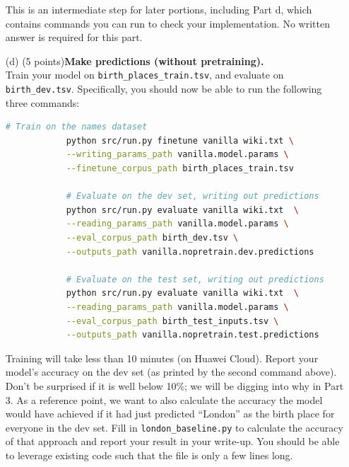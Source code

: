 \documentclass[letterpaper,12pt]{article}
\begin{document}
\begin{itemize}
		This is an intermediate step for later portions, including Part d, which contains commands you can run to check your implementation. No written answer is required for this part.
		
	\item[(d)]
		(5 points)\textbf{Make predictions (without pretraining).}\\ 
		Train your model on \texttt{birth\_places\_train.tsv}, and evaluate on \texttt{birth\_dev.tsv}. Specifically, you should now be able to run the following three commands:
		\begin{lstlisting}[language=bash, basicstyle=\small\ttfamily]
			# Train on the names dataset
			python src/run.py finetune vanilla wiki.txt \
			--writing_params_path vanilla.model.params \
			--finetune_corpus_path birth_places_train.tsv
			
			# Evaluate on the dev set, writing out predictions
			python src/run.py evaluate vanilla wiki.txt  \
			--reading_params_path vanilla.model.params \
			--eval_corpus_path birth_dev.tsv \
			--outputs_path vanilla.nopretrain.dev.predictions
			
			# Evaluate on the test set, writing out predictions
			python src/run.py evaluate vanilla wiki.txt  \
			--reading_params_path vanilla.model.params \
			--eval_corpus_path birth_test_inputs.tsv \
			--outputs_path vanilla.nopretrain.test.predictions
		\end{lstlisting}
		
		Training will take less than 10 minutes (on Huawei Cloud).  Report your model's accuracy on the dev set (as printed by the second command above). Don't be surprised if it is well below 10\%; we will be digging into why in Part 3. As a reference point, we want to also calculate the accuracy the model would have achieved if it had just predicted ``London'' as the birth place for everyone in the dev set. Fill in \texttt{london\_baseline.py} to calculate the accuracy of that approach and report your result in your write-up. You should be able to leverage existing code such that the file is only a few lines long. 
		

\end{itemize}
\end{document}
